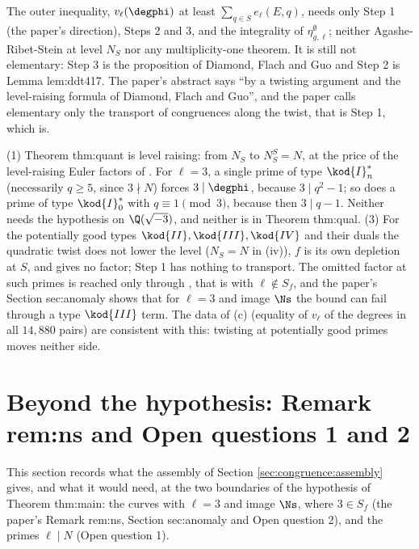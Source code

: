 \begin{remark}\label{rem:congruence:outer-inequality}
The outer inequality, $v_\ell(\degphi)$ at least $\sum_{q\in S}e_\ell(E,q)$, needs only Step 1 (the paper's direction), Steps 2 and 3, and the integrality of $\eta^\emptyset_{g,\ell}$; neither Agashe-Ribet-Stein at level $N_S$ nor
any multiplicity-one theorem. It is still not elementary: Step 3 is the proposition of Diamond, Flach and Guo and Step 2 is Lemma lem:ddt417. The paper's abstract says ``by a twisting
argument and the level-raising formula of Diamond, Flach and Guo'', and the paper calls elementary only the transport of congruences along the twist, that is Step 1, which is.
\end{remark}

\begin{remark}\label{rem:congruence:after-quant}
(1) Theorem thm:quant is level raising: from $N_S$ to $N_S^S=N$, at the price of the level-raising Euler factors of . For $\ell=3$, a single prime of type $\kod{I}_n^*$ (necessarily
$q\ge5$, since $3\nmid N$) forces $3\mid\degphi$, because $3\mid q^2-1$; so does a prime of type $\kod{I}_0^*$ with $q\equiv1\pmod3$, because then $3\mid q-1$. Neither needs the hypothesis on $\Q(\sqrt{-3})$, and
neither is in Theorem thm:qual. (3) For the potentially good types $\kod{II},\kod{III},\kod{IV}$ and their duals the quadratic twist does not lower the level ($N_S=N$ in (iv)), $f$ is its own
depletion at $S$, and  gives no factor; Step 1 has nothing to transport. The omitted factor at such primes is reached only through , that is with
$\ell\notin S_f$, and the paper's Section sec:anomaly shows that for $\ell=3$ and image $\Ns$ the bound can fail through a type $\kod{III}$ term. The data of (c) (equality of
$v_\ell$ of the degrees in all $14{,}880$ pairs) are consistent with this: twisting at potentially good primes moves neither side.
\end{remark}

\section[Beyond the hypothesis: rem:ns, Open questions 1, 2]{Beyond the hypothesis: Remark rem:ns and Open questions 1 and 2}\label{sec:congruence:beyond}

This section records what the assembly of Section \ref{sec:congruence:assembly} gives, and what it would need, at the two boundaries of the hypothesis of Theorem thm:main: the
curves with $\ell=3$ and image $\Ns$, where $3\in S_f$ (the paper's Remark rem:ns, Section sec:anomaly and Open question 2), and the primes $\ell\mid N$ (Open question 1).

